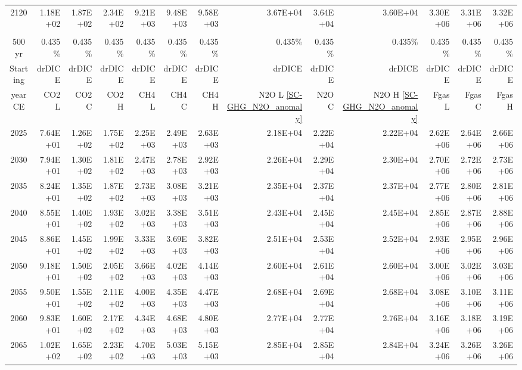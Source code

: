 \documentclass{article}
\begin{document}
\begin{table}
\begin{tabular}{crrr|rrr|rrr|rrr}
2120     & 1.18E+02 & 1.87E+02 & 2.34E+02 & 9.21E+03 & 9.48E+03 & 9.58E+03 & 3.67E+04 & 3.64E+04 & 3.60E+04 & 3.30E+06 & 3.31E+06 & 3.32E+06 \\
         &          &          &          &          &          &          &          &          &          &          &          &          \\ \hline
500 yr   & 0.435\%  & 0.435\%  & 0.435\%  & 0.435\%  & 0.435\%  & 0.435\%  & 0.435\%  & 0.435\%  & 0.435\%  & 0.435\%  & 0.435\%  & 0.435\%  \\
Starting & drDICE   & drDICE   & drDICE   & drDICE   & drDICE   & drDICE   & drDICE   & drDICE   & drDICE   & drDICE   & drDICE   & drDICE   \\
year CE  & CO2 L    & CO2 C    & CO2 H    & CH4 L    & CH4 C    & CH4 H    & N2O L \ref{SC-GHG_N2O_anomaly}     & N2O C      & N2O H \ref{SC-GHG_N2O_anomaly}    & Fgas L   & Fgas C   & Fgas H   \\
2025     & 7.64E+01 & 1.26E+02 & 1.75E+02 & 2.25E+03 & 2.49E+03 & 2.63E+03 & 2.18E+04 & 2.22E+04 & 2.22E+04 & 2.62E+06 & 2.64E+06 & 2.66E+06 \\
2030     & 7.94E+01 & 1.30E+02 & 1.81E+02 & 2.47E+03 & 2.78E+03 & 2.92E+03 & 2.26E+04 & 2.29E+04 & 2.30E+04 & 2.70E+06 & 2.72E+06 & 2.73E+06 \\
2035     & 8.24E+01 & 1.35E+02 & 1.87E+02 & 2.73E+03 & 3.08E+03 & 3.21E+03 & 2.35E+04 & 2.37E+04 & 2.37E+04 & 2.77E+06 & 2.80E+06 & 2.81E+06 \\
2040     & 8.55E+01 & 1.40E+02 & 1.93E+02 & 3.02E+03 & 3.38E+03 & 3.51E+03 & 2.43E+04 & 2.45E+04 & 2.45E+04 & 2.85E+06 & 2.87E+06 & 2.88E+06 \\
2045     & 8.86E+01 & 1.45E+02 & 1.99E+02 & 3.33E+03 & 3.69E+03 & 3.82E+03 & 2.51E+04 & 2.53E+04 & 2.52E+04 & 2.93E+06 & 2.95E+06 & 2.96E+06 \\
2050     & 9.18E+01 & 1.50E+02 & 2.05E+02 & 3.66E+03 & 4.02E+03 & 4.14E+03 & 2.60E+04 & 2.61E+04 & 2.60E+04 & 3.00E+06 & 3.02E+06 & 3.03E+06 \\
2055     & 9.50E+01 & 1.55E+02 & 2.11E+02 & 4.00E+03 & 4.35E+03 & 4.47E+03 & 2.68E+04 & 2.69E+04 & 2.68E+04 & 3.08E+06 & 3.10E+06 & 3.11E+06 \\
2060     & 9.83E+01 & 1.60E+02 & 2.17E+02 & 4.34E+03 & 4.68E+03 & 4.80E+03 & 2.77E+04 & 2.77E+04 & 2.76E+04 & 3.16E+06 & 3.18E+06 & 3.19E+06 \\
2065     & 1.02E+02 & 1.65E+02 & 2.23E+02 & 4.70E+03 & 5.03E+03 & 5.15E+03 & 2.85E+04 & 2.85E+04 & 2.84E+04 & 3.24E+06 & 3.26E+06 & 3.26E+06 \\

\end{tabular}
\end{table}
\end{document}
